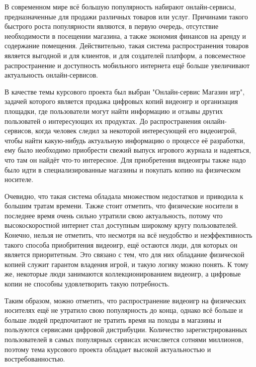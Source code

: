\label{sec:introduction}

В современном мире всё большую популярность набирают онлайн-сервисы, предназначенные для продажи различных товаров или услуг.
Причинами такого быстрого роста популярности являются, в первую очередь, отсутствие необходимости в посещении магазина, а также
экономия финансов на аренду и содержание помещения. Действительно, такая система распространения товаров является выгодной и для клиентов,
и для создателей платформ, а повсеместное распространение и доступность мобильного интернета ещё больше увеличивают 
актуальность онлайн-сервисов.

В качестве темы курсового проекта был выбран "Онлайн-сервис Магазин игр", задачей которого является продажа цифровых копий видеоигр и
организация площадки, где пользователи могут найти информацию и отзывы других пользоватей о интересующих их продуктах. До распространения
онлайн-сервисов, когда человек следил за некоторой интересующей его видеоигрой, чтобы найти какую-нибудь актуальную информацию о процессе
её разработки, ему было необходимо приобрести свежий выпуск игрового журнала и надеяться, что там он найдёт что-то интересное. Для 
приобретения видеоигры также надо было идти в специализированные магазины и покупать копию на физическом носителе.

Очевидно, что такая система обладала множеством недостатков и приводила к большим тратам времени. Также стоит отметить, что физические
носители в последнее время очень сильно утратили свою актуальность, потому что высокоскоростной интернет стал доступным широкому кругу
пользователей. Конечно, нельзя не отметить, что несмотря на всё неудобство и неэффективность такого способа приобритения видеоигр, ещё
остаются люди, для которых он является приоритетным. Это связано с тем, что для них обладание физической копией служит гарантом владения
игрой, и такую логику можно понять. К тому же, некоторые люди занимаются коллекционированием видеоигр, а цифровые копии не способны
удовлетворить такую потребность.

Таким образом, можно отметить, что распространение видеоигр на физических носителях ещё не утратило свою популярность до конца, однако
всё больше и больше людей предпочитают не тратить время на походы в магазины и пользуются сервисами цифровой дистрибуции. Количество
зарегистрированных пользователей в самых популярных сервисах исчисляется сотнями миллионов, поэтому тема курсового проекта обладает
высокой актуальностью и востребованностью.